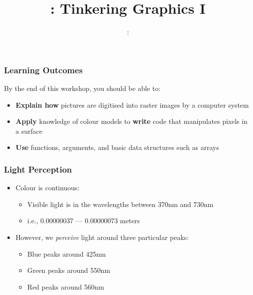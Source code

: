 \usepackage{../../beamerthemeFalmouthGamesAcademy}
\usepackage{multimedia}
\graphicspath{ {../../} }


\usepackage[normalem]{ulem}
\usepackage{wasysym}

\usepackage{pdfpages}

\usetikzlibrary{arrows,automata}







\title{\sessionnumber: Tinkering Graphics I}
\subtitle{\modulecode: \moduletitle}

\frame{\titlepage} 

\begin{frame}
	\frametitle{Learning Outcomes}
	By the end of this workshop, you should be able to:	
	\begin{itemize}
		\item \textbf{Explain how} pictures are digitised into raster images by a computer system
		\item \textbf{Apply} knowledge of colour models to \textbf{write} code that manipulates pixels in a surface
		\item \textbf{Use} functions, arguments, and basic data structures such as arrays
	\end{itemize}
\end{frame}

\begin{frame}
	\frametitle{Light Perception}
	\begin{itemize}
		\item Colour is continuous:
		\begin{itemize}
			\item Visible light is in the wavelengths between 370nm and 730nm
			\item i.e., 0.00000037 --- 0.00000073 meters
		\end{itemize}
		\item However, we \textit{perceive} light around three particular peaks:
		\begin{itemize}
			\item Blue peaks around 425nm
			\item Green peaks around 550nm
			\item Red peaks around 560nm
		\end{itemize}
	\end{itemize}
\end{frame}

